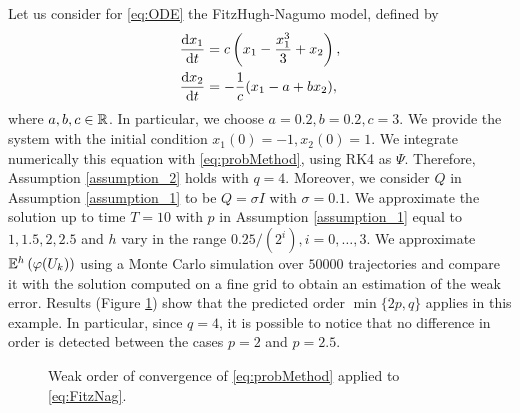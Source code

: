 Let us consider for \eqref{eq:ODE} the FitzHugh-Nagumo model, defined by
\begin{equation}\label{eq:FitzNag}
\begin{aligned}
	\dv{x_1}{t} &= c\left(x_1 - \frac{x_1^3}{3} + x_2\right), \\
	\dv{x_2}{t} &= -\frac{1}{c}(x_1 - a + bx_2),
\end{aligned}
\end{equation}
where $a, b, c \in \mathbb{R}$. In particular, we choose $a = 0.2, b = 0.2, c = 3$. We provide the system with the initial condition $x_1(0) = -1, x_2(0) = 1$. We integrate numerically this equation with \eqref{eq:probMethod}, using RK4 as $\Psi$. Therefore, Assumption \ref{assumption_2} holds with $q = 4$. Moreover, we consider $Q$ in Assumption \ref{assumption_1} to be $Q = \sigma I$ with $\sigma = 0.1$. We approximate the solution up to time $T = 10$ with $p$ in Assumption \ref{assumption_1} equal to $1, 1.5, 2, 2.5$  and $h$ vary in the range $0.25 / (2^i), i = 0, \ldots, 3$. We approximate $\mathbb{E}^h\left(\varphi(U_k)\right)$ using a Monte Carlo simulation over $50000$ trajectories and compare it with the solution computed on a fine grid to obtain an estimation of the weak error. Results (Figure \ref{fig:weakorder}) show that the predicted order $\min\{2p, q\}$ applies in this example. In particular, since $q = 4$, it is possible to notice that no difference in order is detected between the cases $p = 2$ and $p = 2.5$. 

\begin{figure}
\centering
\resizebox{0.6\linewidth}{!}{}
\caption{Weak order of convergence of \eqref{eq:probMethod} applied to \eqref{eq:FitzNag}.}
\label{fig:weakorder}
\end{figure}